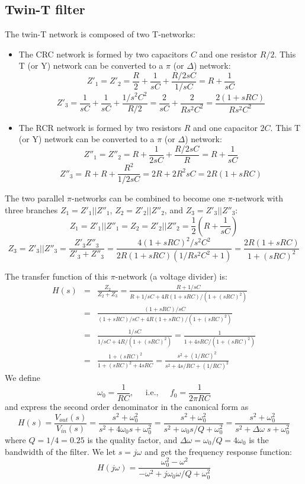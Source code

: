 \usepackage{html}


\subsection*{Twin-T filter}

The twin-T network is composed of two T-networks: 
\begin{itemize}
\item The CRC network is formed by two capacitors $C$ and one
  resistor $R/2$. This T (or Y) network can be converted to a
  $\pi$ (or $\Delta$) network:
  \[
  Z'_1=Z'_2=\frac{R}{2}+\frac{1}{sC}+\frac{R/2sC}{1/sC}=R+\frac{1}{sC}
  \]
  \[
  Z'_3=\frac{1}{sC}+\frac{1}{sC}+\frac{1/s^2C^2}{R/2}
  =\frac{2}{sC}+\frac{2}{Rs^2C^2}=\frac{2(1+sRC)}{Rs^2C^2}
  \]
\item The RCR network is formed by two resistors $R$ and one
  capacitor $2C$. This T (or Y) network can be converted to a
  $\pi$ (or $\Delta$) network:
  \[
  Z''_1=Z''_2=R+\frac{1}{2sC}+\frac{R/2sC}{R}=R+\frac{1}{sC}
  \]
  \[
  Z''_3=R+R+\frac{R^2}{1/2sC}=2R+2R^2sC=2R(1+sRC)
  \]
\end{itemize}
The two parallel $\pi$-networks can be combined to become one
$\pi$-network with three branches $Z_1=Z'_1||Z''_1$, $Z_2=Z'_2||Z''_2$, 
and $Z_3=Z'_3||Z''_3$:
\[
Z_1=Z'_1||Z''_1=Z_2=Z'_2||Z''_2=\frac{1}{2}\left(R+\frac{1}{sC}\right)
\]
\[
  Z_3=Z'_3||Z''_3=\frac{Z'_3 Z''_3}{Z'_3+Z''_3}
  =\frac{4(1+sRC)^2/s^2C^2}{2R(1+sRC)(1/Rs^2C^2+1)}
  =\frac{2R(1+sRC)}{1+(sRC)^2}
\]

The transfer function of this $\pi$-network (a voltage divider) is:
\begin{eqnarray}
H(s)&=&\frac{Z_2}{Z_2+Z_3}=\frac{R+1/sC}{R+1/sC+4R(1+sRC)/(1+(sRC)^2)}
\nonumber \\
&=&\frac{(1+sRC)/sC}{(1+sRC)/sC+4R(1+sRC)/(1+(sRC)^2)}
\nonumber \\
&=&\frac{1/sC}{1/sC+4R/(1+(sRC)^2)}
=\frac{1}{1+4sRC/(1+(sRC)^2)}
\nonumber \\
&=&\frac{1+(sRC)^2}{1+(sRC)^2+4sRC}
=\frac{s^2+(1/RC)^2}{s^2+4s/RC+(1/RC)^2}
\nonumber
\end{eqnarray}
We define
\[
\omega_0=\frac{1}{RC},\;\;\;\;\;\mbox{i.e.,}\;\;\;\;\;
f_0=\frac{1}{2\pi RC}
\]
and express the second order denominator in the canonical form as
\[
H(s)=\frac{V_{out}(s)}{V_{in}(s)}=\frac{s^2+\omega_0^2}{s^2+4\omega_0s+\omega_0^2}
=\frac{s^2+\omega_0^2}{s^2+\omega_0s/Q+\omega_0^2}
=\frac{s^2+\omega_0^2}{s^2+\Delta\omega\;s+\omega_0^2}
\]
where $Q=1/4=0.25$ is the quality factor, and 
$\Delta\omega=\omega_0/Q=4\omega_0$ is the bandwidth of the filter.
We let $s=j\omega$ and get the frequency response function:
\[
H(j\omega)=\frac{\omega_0^2-\omega^2}{-\omega^2+j\omega_0\omega/Q+\omega_0^2}
\]

